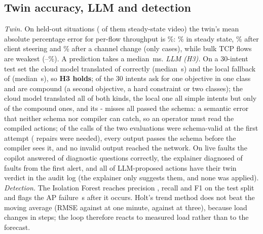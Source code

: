 \documentclass[conference]{IEEEtran}
\begin{document}
\begin{table}[t]
\caption{Stricter acceptance rules applied to the recorded predictions of V2's resolved actions: how many harmful actions each would have rejected, and how many kept ones.}
\label{tab:rules}
\centering\small

\end{table}

\subsection{Twin accuracy, LLM and detection}
\emph{Twin.} On \TwinN{} held-out situations (\TwinSteadyN{} of them steady-state video) the twin's mean absolute percentage error for per-flow throughput is \TwinMape\%: \TwinSteadyVideo\% in steady state, \TwinSteer\% after client steering and \TwinChannel\% after a channel change (only \TwinChannelN{} cases), while bulk TCP flows are weakest (\TwinBulkLow--\TwinBulkHigh\%). A prediction takes a median \SimMedianMs\,ms. \emph{LLM (H3).} On a 30-intent test set the cloud model translated \IntCloudOk{} of \IntCases{} correctly (median \IntCloudSeconds\,s) and the local fallback \IntLocalOk{} of \IntCases{} (median \IntLocalSeconds\,s), so \textbf{H3 holds}; of the 30 intents \IntSimple{} ask for one objective in one class and \IntCompound{} are compound (a second objective, a hard constraint or two classes); the cloud model translated all of both kinds, the local one all \IntLocalSimpleOk{} simple intents but only \IntLocalCompoundOk{} of the compound ones, and its \the\numexpr\IntCases-\IntLocalOk\relax{} misses all passed the schema: a semantic error that neither schema nor compiler can catch, so an operator must read the compiled actions; \IntFirstValid{} of the \IntCalls{} calls of the two evaluations were schema-valid at the first attempt (\IntRepairs{} repairs were needed), every output passes the schema before the compiler sees it, and no invalid output reached the network. On live faults the copilot answered \GenCopilotOk{} of \GenCopilotN{} diagnostic questions correctly, the explainer diagnosed \GenRcaOk{} of \GenRcaN{} faults from the first alert, and all \GenActionsVerdict{} of \GenActions{} LLM-proposed actions have their twin verdict in the audit log (the explainer only suggests them, and none was applied). \emph{Detection.} The Isolation Forest reaches precision \AnoPrecision, recall \AnoRecall{} and F1 \AnoF{} on the test split and flags the AP failure \AnoDelayFail\,s after it occurs. Holt's trend method does not beat the moving average (RMSE \FcHoltOne{} against \FcMaOne{} at one minute, \FcHoltThree{} against \FcMaThree{} at three), because load changes in steps; the loop therefore reacts to measured load rather than to the forecast.
\end{document}

